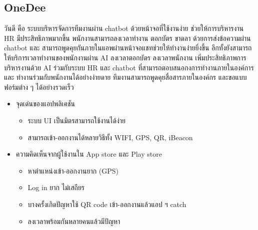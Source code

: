 \subsection{OneDee}
\quad วันดี คือ ระบบบริหารจัดการทีมงานผ่าน chatbot ด้วยหน้าจอที่ใช้งานง่าย ช่วยให้การบริหารงาน HR มีประสิทธิภาพมากขึ้น 
พนักงานสามารถลงเวลาทำงาน ตอกบัตร ขาดลา ด้วยการส่งข้อความผ่าน chatbot และ สามารถพูดคุยกันภายในแอพผ่านหน้าจอแชทช่วยให้ทำงานง่ายยิ่งขึ้น 
อีกทั้งยังสามารถให้บริการเวลาทำงานของพนักงานผ่าน AI ลงเวลาตอกบัตร ลงเวลาพนักงาน เพิ่มประสิทธิภาพการบริหารงานด้วย AI ร่วมกับระบบ HR และ chatbot 
ที่สามารถตอบสนอกงการทำงานภายในองค์การ และ ทำงานร่วมกับพนักงานได้อย่างง่ายดาย ทีมงานสามารถพูดคุยสื่อสารภายในองค์กร และขอแบบฟอร์มต่าง ๆ ได้อย่างรวดเร็ว  
\cite{onedee}
\begin{itemize}
  \item จุดเด่นของแอปพลิเคชัน
  \begin{itemize}
    \item ระบบ UI เป็นมิตรสามารถใช้งานได้ง่าย 
    \item สามารถเข้า-ออกงานได้หลายวิธีทั้ง WIFI, GPS, QR, iBeacon 
  \end{itemize}
  \item ความคิดเห็นจากผู้ใช้งานใน App store และ Play store
  \begin{itemize}
    \item หาตำแหน่งเข้า-ออกงานยาก (GPS)  
    \item Log in ยาก ไม่เสถียร  
    \item บางครั้งเกิดปัญหาใช้ QR code เข้า-ออกงานแล้วแอป ฯ catch 
    \item ลงเวลาพร้อมกันหลายคนแล้วมีปัญหา 
  \end{itemize}
\end{itemize}

